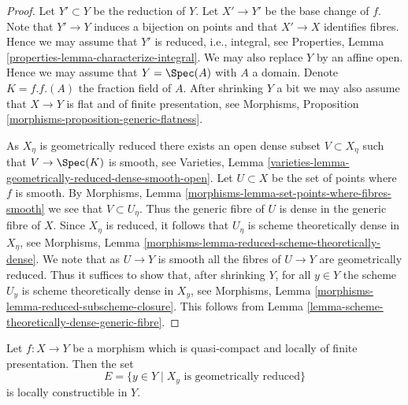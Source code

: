 \begin{proof}
Let $Y' \subset Y$ be the reduction of $Y$. Let $X' \to Y'$
be the base change of $f$. Note that $Y' \to Y$
induces a bijection on points and that $X' \to X$ identifies fibres.
Hence we may assume that $Y'$ is reduced, i.e., integral, see
Properties, Lemma \ref{properties-lemma-characterize-integral}.
We may also replace $Y$ by an affine open. Hence we may assume that
$Y = \Spec(A)$ with $A$ a domain. Denote $K = f.f.(A)$ the
fraction field of $A$. After shrinking $Y$ a bit we may also assume that
$X \to Y$ is flat and of finite presentation, see
Morphisms, Proposition \ref{morphisms-proposition-generic-flatness}.

\medskip\noindent
As $X_\eta$ is geometrically reduced there exists an open dense
subset $V \subset X_\eta$ such that $V \to \Spec(K)$ is smooth, see
Varieties, Lemma \ref{varieties-lemma-geometrically-reduced-dense-smooth-open}.
Let $U \subset X$ be the set of points where $f$ is smooth. By
Morphisms, Lemma \ref{morphisms-lemma-set-points-where-fibres-smooth}
we see that $V \subset U_\eta$. Thus the generic fibre of $U$ is dense
in the generic fibre of $X$. Since $X_\eta$ is reduced, it follows
that $U_\eta$ is scheme theoretically dense in $X_\eta$, see
Morphisms, Lemma \ref{morphisms-lemma-reduced-scheme-theoretically-dense}.
We note that as $U \to Y$ is smooth all the fibres of $U \to Y$
are geometrically reduced. Thus it suffices to show that, after
shrinking $Y$, for all $y \in Y$ the scheme $U_y$ is scheme theoretically
dense in $X_y$, see
Morphisms, Lemma \ref{morphisms-lemma-reduced-subscheme-closure}.
This follows from
Lemma \ref{lemma-scheme-theoretically-dense-generic-fibre}.
\end{proof}

\begin{lemma}
\label{lemma-geometrically-reduced-constructible}
Let $f : X \to Y$ be a morphism which is quasi-compact and
locally of finite presentation. Then the set
$$
E = \{y \in Y \mid X_y\text{ is geometrically reduced}\}
$$
is locally constructible in $Y$.
\end{lemma}

